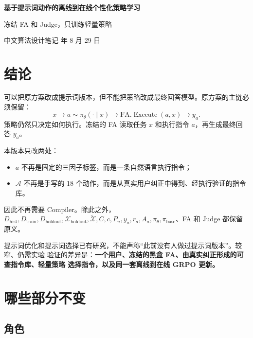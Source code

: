 \documentclass[11pt,UTF8,fontset=fandol]{ctexart}
\newcommand{\Dhist}{D_{\mathrm{hist}}}
\newcommand{\Dtrain}{D_{\mathrm{train}}}
\newcommand{\Dholdout}{D_{\mathrm{holdout}}}
\newcommand{\Xholdout}{\mathcal X_{\mathrm{holdout}}}
\newcommand{\Xsim}{\widetilde{\mathcal X}}
\newcommand{\policy}{\pi_{\theta}}
\newcommand{\basepolicy}{\pi_{\mathrm{base}}}
\newcommand{\FA}{\mathrm{FA}}
\begin{document}
\begin{center}
  {\LARGE\bfseries 基于提示词动作的离线到在线个性化策略学习\par}
  \vspace{5pt}
  {\large 冻结 FA 和 Judge，只训练轻量策略\par}
  \vspace{4pt}
  {\small 中文算法设计笔记  年 8 月 29 日}
\end{center}

\section{结论}

可以把原方案改成提示词版本，但不能把策略改成最终回答模型。原方案的主链必须保留：
\begin{equation}
  x
  \longrightarrow
  a\sim\policy(\cdot\mid x)
  \longrightarrow
  \FA.\operatorname{Execute}(a,x)
  \longrightarrow
  y_a.
  \label{eq:chain}
\end{equation}
策略仍然只决定如何执行。冻结的 FA 读取任务 \(x\) 和执行指令 \(a\)，再生成最终回答
\(y_a\)。

本版本只改两处：
\begin{itemize}
  \item \(a\) 不再是固定的三因子标签，而是一条自然语言执行指令；
  \item \(\mathcal A\) 不再是手写的 18 个动作，而是从真实用户纠正中得到、经执行验证的指令库。
\end{itemize}
因此不再需要 Compiler。除此之外，\(\Dhist,\Dtrain,\Dholdout,\Xholdout,
\Xsim,C,c,P_u,y_a,r_a,A_a,\policy,\basepolicy\)、FA 和 Judge 都保留原义。

提示词优化和提示词选择已有研究，不能声称``此前没有人做过提示词版本''。较窄、仍需实验
验证的差异是：\textbf{一个用户、冻结的黑盒 FA、由真实纠正形成的可查指令库、轻量策略
选择指令，以及同一套离线到在线 GRPO 更新。}

\section{哪些部分不变}

\subsection{角色}
\end{document}
